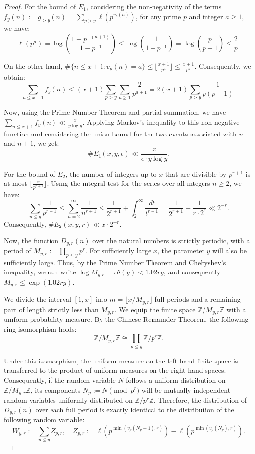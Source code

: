 \documentclass[12pt, a4paper]{article}
\theoremstyle{plain}
\theoremstyle{definition}
\begin{document}
\begin{proof}
For the bound of $E_1$, considering the non-negativity of the terms $f_y(n) := g_{>y}(n) = \sum_{p > y} \ell(p^{v_p(n)})$, for any prime $p$ and integer $a \geq 1$, we have:
\[ \ell(p^a) = \log \left( \frac{1 - p^{-(a+1)}}{1 - p^{-1}} \right) \leq \log \left(\frac{1}{1 - p^{-1}}\right) = \log \left(\frac{p}{p - 1}\right) \leq \frac{2}{p}. \]

On the other hand, $\text{\#}\{n \leq x + 1 : v_p(n) = a\} \leq \lfloor \frac{x+1}{p^a} \rfloor \leq \frac{x+1}{p^a}$. Consequently, we obtain:
\[ \sum_{n \leq x+1} f_y(n) \leq (x + 1) \sum_{p > y} \sum_{a \geq 1} \frac{2}{p^{a+1}} = 2(x + 1) \sum_{p > y} \frac{1}{p(p - 1)}. \]

Now, using the Prime Number Theorem and partial summation, we have $\sum_{n \leq x+1} f_y(n) \ll \frac{x}{y \log y}$. Applying Markov's inequality to this non-negative function and considering the union bound for the two events associated with $n$ and $n + 1$, we get:
\[ \text{\#}E_1(x, y, \epsilon) \ll \frac{x}{\epsilon \cdot y \log y}. \]

For the bound of $E_2$, the number of integers up to $x$ that are divisible by $p^{r+1}$ is at most $\lfloor \frac{x}{p^{r+1}} \rfloor$. Using the integral test for the series over all integers $n \geq 2$, we have:
\[ \sum_{p \leq y} \frac{1}{p^{r+1}} \leq \sum_{n=2}^{\infty} \frac{1}{n^{r+1}} \leq \frac{1}{2^{r+1}} + \int_{2}^{\infty} \frac{dt}{t^{r+1}} = \frac{1}{2^{r+1}} + \frac{1}{r \cdot 2^r} \ll 2^{-r}. \]
Consequently, $\text{\#}E_2(x, y, r) \ll x \cdot 2^{-r}$.

Now, the function $D_{y,r}(n)$ over the natural numbers is strictly periodic, with a period of $M_{y,r} := \prod_{p \leq y} p^r$. For sufficiently large $x$, the parameter $y$ will also be sufficiently large. Thus, by the Prime Number Theorem and Chebyshev's inequality, we can write $\log M_{y,r} = r\theta(y) < 1.02ry$, and consequently $M_{y,r} \leq \exp(1.02ry)$.

We divide the interval $[1, x]$ into $m = \lfloor x / M_{y,r} \rfloor$ full periods and a remaining part of length strictly less than $M_{y,r}$. We equip the finite space $\mathbb{Z}/M_{y,r}\mathbb{Z}$ with a uniform probability measure. By the Chinese Remainder Theorem, the following ring isomorphism holds:
\[ \mathbb{Z}/M_{y,r}\mathbb{Z} \cong \prod_{p \leq y} \mathbb{Z}/p^r\mathbb{Z}. \]

Under this isomorphism, the uniform measure on the left-hand finite space is transferred to the product of uniform measures on the right-hand spaces. Consequently, if the random variable $N$ follows a uniform distribution on $\mathbb{Z}/M_{y,r}\mathbb{Z}$, its components $N_p := N \pmod{p^r}$ will be mutually independent random variables uniformly distributed on $\mathbb{Z}/p^r\mathbb{Z}$. Therefore, the distribution of $D_{y,r}(n)$ over each full period is exactly identical to the distribution of the following random variable:
\[ W_{y,r} := \sum_{p \leq y} Z_{p,r}, \quad Z_{p,r} := \ell\left(p^{\min(v_p(N_p + 1), r)}\right) - \ell\left(p^{\min(v_p(N_p), r)}\right). \]


\end{proof}
\end{document}
